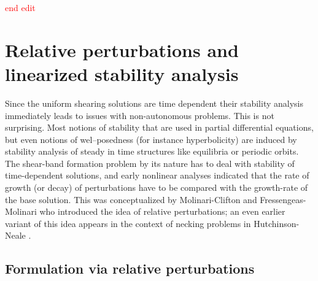 \documentclass[a4paper,11pt]{article}
\newcommand{\tcr}{\textcolor{red}}
\theoremstyle{remark}
\begin{document}
\tcr{end edit}


\vfil\eject

\section{Relative perturbations and linearized stability analysis}
\label{sec:relative}

Since the uniform shearing solutions are time dependent their stability analysis immediately leads to issues with non-autonomous problems.
This is not surprising. Most notions of stability that are used in partial differential equations, but even notions of wel--posedness 
(for instance hyperbolicity) are induced by stability analysis of steady in time structures like equilibria or periodic orbits.
The shear-band formation problem by its nature has to deal with stability of time-dependent solutions, and early nonlinear
analyses \cite{DH83,Tzavaras86a} indicated that the rate of growth (or decay) of perturbations have to be compared with the
growth-rate of the base solution. This was conceptualized  by Molinari-Clifton \cite{MC87} and Fressengeas-Molinari \cite{FM87} who
introduced the idea of relative perturbations; an even earlier variant of this idea appears in the context of necking
problems in Hutchinson-Neale \cite{HN77}.




\subsection{Formulation via relative perturbations}
\end{document}
